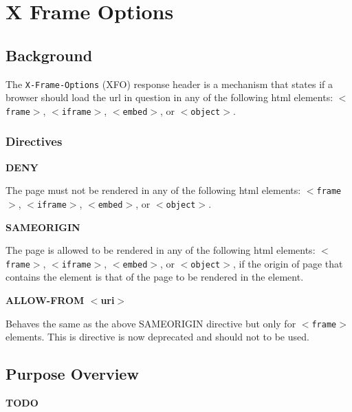 \documentclass{mscreport}
\begin{document}
\clearpage
\newpage

\section{X Frame Options}
\label{section:xfo}

\subsection{Background}

The \texttt{X-Frame-Options} (XFO) response header is a mechanism that states if a browser should load the url in question in any of the following html elements: \texttt{$<$frame$>$}, \texttt{$<$iframe$>$}, \texttt{$<$embed$>$}, or \texttt{$<$object$>$}.

\subsubsection{Directives}

\textbf{DENY}

\vspace{0.3cm} \noindent
The page must not be rendered in any of the following html elements: \texttt{$<$frame$>$}, \texttt{$<$iframe$>$}, \texttt{$<$embed$>$}, or \texttt{$<$object$>$}.

\vspace{0.7cm} \noindent
\textbf{SAMEORIGIN}

\vspace{0.3cm} \noindent
The page is allowed to be rendered in any of the following html elements: \texttt{$<$frame$>$}, \texttt{$<$iframe$>$}, \texttt{$<$embed$>$}, or \texttt{$<$object$>$}, if the origin of page that contains the element is that of the page to be rendered in the element.

\vspace{0.7cm} \noindent
\textbf{ALLOW-FROM $<$uri$>$}

\vspace{0.3cm} \noindent
Behaves the same as the above SAMEORIGIN directive but only for \texttt{$<$frame$>$} elements. This is directive is now deprecated and should not to be used.

\subsection{Purpose Overview}

\textbf{TODO}

\clearpage
\newpage
\end{document}
